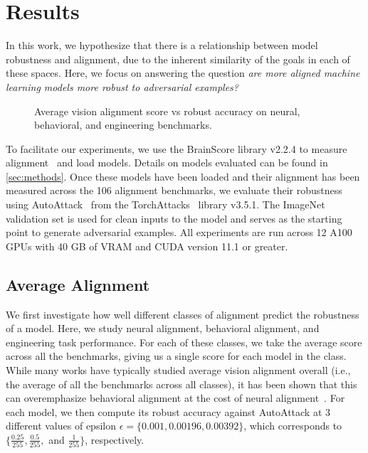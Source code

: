 \section{Results}\label{sec:results}
In this work, we hypothesize that there is a relationship between model robustness and alignment, due to the inherent similarity of the goals in each of these spaces. Here, we focus on answering the question \textit{are more aligned machine learning models more robust to adversarial examples?}

\begin{figure}[t!]
    \centering
    \hfill 
    \hfill 
    \caption{Average vision alignment score vs robust accuracy on neural, behavioral, and engineering benchmarks.}
    \label{fig:avg_vision_robustness}
\end{figure}

To facilitate our experiments, we use the BrainScore library v2.2.4 to measure alignment~\cite{schrimpf_brain-score_2018} and load models. Details on models evaluated can be found in \autoref{sec:methods}. Once these models have been loaded and their alignment has been measured across the 106 alignment benchmarks, we evaluate their robustness using AutoAttack~\cite{croce_reliable_2020} from the TorchAttacks~\cite{kim_torchattacks_2021} library v3.5.1. The ImageNet~\cite{russakovsky_imagenet_2015} validation set is used for clean inputs to the model and serves as the starting point to generate adversarial examples. All experiments are run across 12 A100 GPUs with 40 GB of VRAM and CUDA version 11.1 or greater.  



\subsection{Average Alignment}
We first investigate how well different classes of alignment predict the robustness of a model. Here, we study neural alignment, behavioral alignment, and engineering task performance. For each of these classes, we take the average score across all the benchmarks, giving us a single score for each model in the class. While many works have typically studied average vision alignment overall (i.e., the average of all the benchmarks across all classes), it has been shown that this can overemphasize behavioral alignment at the cost of neural alignment~\cite{ahlert_how_2024}. For each model, we then compute its robust accuracy against AutoAttack at 3 different values of epsilon $\epsilon = \{0.001, 0.00196, 0.00392\}$, which corresponds to $\{\frac{0.25}{255}, \frac{0.5}{255},$ and $ \frac{1}{255}\}$, respectively. 


